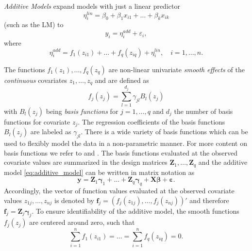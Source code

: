 
\textit{Additive Models} expand models with just a linear predictor  
$$
\eta_{i}^{lin} = \beta_{0}+\beta_{1} x_{i1}+\ldots+\beta_{k} x_{i k}
$$
(such as the \ac{LM}) to 
\begin{equation}
y_{i} = \eta_{i}^{add} + \varepsilon_{i} ,
\label{eq:additive_model}
\end{equation}
where 
\begin{equation}
\eta_{i}^{a d d}=f_{1}\left(z_{i 1}\right)+\ldots+f_{q}\left(z_{i q}\right)+\eta_{i}^{l i n}, \quad i = 1, \ldots, n.
\end{equation}

The functions $f_{1}(z_{1}), \ldots, f_{q}(z_{q})$ are non-linear univariate \textit{smooth effects} of the \textit{continuous} covariates $z_1, \ldots, z_q$ and are defined as
\begin{equation}
f_{j}\left(z_{j}\right)=\sum_{l=1}^{d_{j}} \gamma_{j l} B_{l}\left(z_{j}\right)
\end{equation}
with $B_{l}\left(z_{j}\right)$ being \textit{basis functions} for $j = 1, \ldots, q$ and $d_j$ the number of basis functions for covariate $z_j$. The regression coefficients of the basis functions $B_l(z_j)$ are labeled as $\gamma_{jl}$. There is a wide variety of basis functions which can be used to flexibly model the data in a non-parametric manner. For more content on basis functions we refer to \cite{wood2017generalized} and \cite{fahrmeir2003regression}. The basis functions evaluated at the observed covariate values are summarized in the design matrices $\bm{Z}_1, \ldots, \bm{Z}_q$ and the additive model \ref{eq:additive_model} can be written in matrix notation as
\begin{equation}
\bm{y} = \bm{Z}_1 \bm{\gamma}_1 + \ldots + \bm{Z}_q \bm{\gamma}_q + \bm{X} \bm{\beta} + \bm{\varepsilon}.
\label{eq:gam_matrix_notation}
\end{equation}
Accordingly, the vector of function values evaluated at the observed covariate values $z_{1j}, \ldots, z_{nj}$ is denoted by $\bm{f}_j = (f_j(z_{1j}), \ldots, f_j(z_{nj}))' $ and therefore $\bm{f}_j = \bm{Z}_j \bm{\gamma}_j$. To ensure identifiability of the additive model, the smooth functions $f_j(z_j)$ are centered around zero, such that
$$
\sum_{i=1}^{n} f_{1}\left(z_{i 1}\right)=\ldots=\sum_{i=1}^{n} f_{q}\left(z_{i q}\right)=0.
$$
\\

